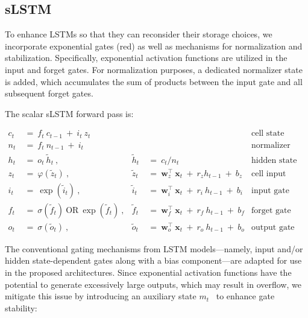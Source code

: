 \subsection{sLSTM}
\label{sec:sLSTM}

To enhance LSTMs so that they can reconsider their storage choices, we incorporate exponential gates (red) as well as mechanisms for normalization and stabilization. Specifically, exponential activation functions are utilized in the input and forget gates. For normalization purposes, a dedicated normalizer state is added, which accumulates the sum of products between the input gate and all subsequent forget gates.

The scalar sLSTM forward pass is:

\begin{align}
\label{eq:slstmforward}
c_t \ &= \  f_t \ c_{t-1} \ + \ i_t \ z_t & & 
 &\text{cell state} \\
n_t \ &= \  f_t \ n_{t-1} \ + \ i_t  & & 
 &\text{normalizer state} \\
h_t \ &= \ o_t \ \tilde{h}_t \ ,
  &\tilde{h}_t \ &= \ c_t / n_t
&\text{hidden state} \\
z_t \ &= \ \varphi \left( \tilde{z}_t \right) \ , 
  &\tilde{z}_t \ &=  \ \mathbf{w}^\top_{z} \ \mathbf{x}_t \ + \
  r_{z}  h_{t-1} \ + \  b_{z}
  &\text{cell input} \\
i_t \ &= \ \!\exp \left( \tilde{i}_t  \right) \ , 
  &\tilde{i}_t \ &= \ \mathbf{w}^\top_{i} \ \mathbf{x}_t \ + \
  r_{i}  \ h_{t-1} \ + \  b_{i}
  &\text{input gate} \\
f_t \ &= \ \sigma \left(  \tilde{f}_t \right) \ \text{OR} \
\!\exp \left(  \tilde{f}_t \right) \ ,
  &\tilde{f}_t \ &= \ \mathbf{w}^\top_{f} \ \mathbf{x}_t  \ + \
  r_{f}  \ h_{t-1} \ + \  b_{f}
  &\text{forget gate} \\
o_t \ &= \ \sigma \left( \tilde{o}_t \right) \ , 
  &\tilde{o}_t  \ &= \ \mathbf{w}^\top_{o} \ \mathbf{x}_t \ + \
  r_{o}  \ h_{t-1} \ + \  b_{o}
  &\text{output gate} 
\end{align}

The conventional gating mechanisms from LSTM models—namely, input and/or hidden state-dependent gates along with a bias component—are adapted for use in the proposed architectures. Since exponential activation functions have the potential to generate excessively large outputs, which may result in overflow, we mitigate this issue by introducing an auxiliary state \mbox{$m_t$~\citep{Milakov:18arxiv}} to enhance gate stability:

